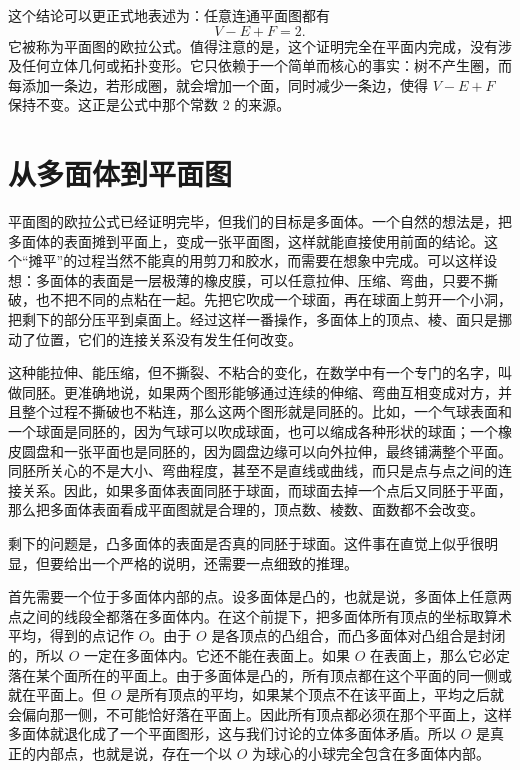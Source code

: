\documentclass[12pt,UTF8,fontset=none]{ctexbook}
\begin{document}
这个结论可以更正式地表述为：任意连通平面图都有
\[
V-E+F=2.
\]
它被称为平面图的欧拉公式。值得注意的是，这个证明完全在平面内完成，没有涉及任何立体几何或拓扑变形。它只依赖于一个简单而核心的事实：树不产生圈，而每添加一条边，若形成圈，就会增加一个面，同时减少一条边，使得 $V-E+F$ 保持不变。这正是公式中那个常数 $2$ 的来源。


\section{从多面体到平面图}

平面图的欧拉公式已经证明完毕，但我们的目标是多面体。一个自然的想法是，把多面体的表面摊到平面上，变成一张平面图，这样就能直接使用前面的结论。这个“摊平”的过程当然不能真的用剪刀和胶水，而需要在想象中完成。可以这样设想：多面体的表面是一层极薄的橡皮膜，可以任意拉伸、压缩、弯曲，只要不撕破，也不把不同的点粘在一起。先把它吹成一个球面，再在球面上剪开一个小洞，把剩下的部分压平到桌面上。经过这样一番操作，多面体上的顶点、棱、面只是挪动了位置，它们的连接关系没有发生任何改变。

这种能拉伸、能压缩，但不撕裂、不粘合的变化，在数学中有一个专门的名字，叫做同胚。更准确地说，如果两个图形能够通过连续的伸缩、弯曲互相变成对方，并且整个过程不撕破也不粘连，那么这两个图形就是同胚的。比如，一个气球表面和一个球面是同胚的，因为气球可以吹成球面，也可以缩成各种形状的球面；一个橡皮圆盘和一张平面也是同胚的，因为圆盘边缘可以向外拉伸，最终铺满整个平面。同胚所关心的不是大小、弯曲程度，甚至不是直线或曲线，而只是点与点之间的连接关系。因此，如果多面体表面同胚于球面，而球面去掉一个点后又同胚于平面，那么把多面体表面看成平面图就是合理的，顶点数、棱数、面数都不会改变。

剩下的问题是，凸多面体的表面是否真的同胚于球面。这件事在直觉上似乎很明显，但要给出一个严格的说明，还需要一点细致的推理。

首先需要一个位于多面体内部的点。设多面体是凸的，也就是说，多面体上任意两点之间的线段全都落在多面体内。在这个前提下，把多面体所有顶点的坐标取算术平均，得到的点记作 $O$。由于 $O$ 是各顶点的凸组合，而凸多面体对凸组合是封闭的，所以 $O$ 一定在多面体内。它还不能在表面上。如果 $O$ 在表面上，那么它必定落在某个面所在的平面上。由于多面体是凸的，所有顶点都在这个平面的同一侧或就在平面上。但 $O$ 是所有顶点的平均，如果某个顶点不在该平面上，平均之后就会偏向那一侧，不可能恰好落在平面上。因此所有顶点都必须在那个平面上，这样多面体就退化成了一个平面图形，这与我们讨论的立体多面体矛盾。所以 $O$ 是真正的内部点，也就是说，存在一个以 $O$ 为球心的小球完全包含在多面体内部。
\end{document}
